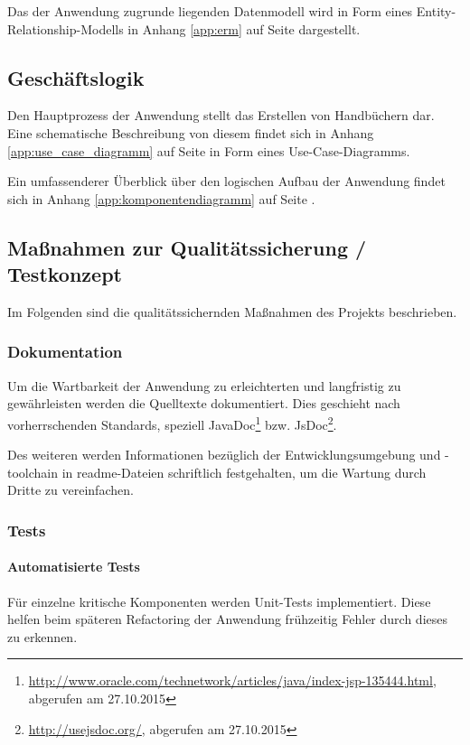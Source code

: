\documentclass[12pt, xcolor=dvipsnames]{scrartcl}
\begin{document}
Das der Anwendung zugrunde liegenden Datenmodell wird in Form eines Entity-Relationship-Modells in Anhang \ref{app:erm} auf Seite \pageref{app:erm} dargestellt.

\subsection{Geschäftslogik}

Den Hauptprozess der Anwendung stellt das Erstellen von Handbüchern dar. Eine schematische Beschreibung von diesem findet sich in Anhang \ref{app:use_case_diagramm} auf Seite \pageref{app:use_case_diagramm} in Form eines Use-Case-Diagramms.

Ein umfassenderer Überblick über den logischen Aufbau der Anwendung findet sich in Anhang \ref{app:komponentendiagramm} auf Seite \pageref{app:komponentendiagramm}.

\subsection{Maßnahmen zur Qualitätssicherung / Testkonzept}

Im Folgenden sind die qualitätssichernden Maßnahmen des Projekts beschrieben.

\subsubsection*{Dokumentation}
Um die Wartbarkeit der Anwendung zu erleichterten und langfristig zu gewährleisten werden die Quelltexte dokumentiert. Dies geschieht nach vorherrschenden Standards, speziell
JavaDoc\footnote{\url{http://www.oracle.com/technetwork/articles/java/index-jsp-135444.html}, abgerufen am 27.10.2015}
bzw.
JsDoc\footnote{\url{http://usejsdoc.org/}, abgerufen am 27.10.2015}.

Des weiteren werden Informationen bezüglich der Entwicklungsumgebung und -toolchain in readme-Dateien schriftlich festgehalten, um die Wartung durch Dritte zu vereinfachen.

\subsubsection*{Tests}
\label{sec:test:test}

\paragraph{Automatisierte Tests}
Für einzelne kritische Komponenten werden Unit-Tests implementiert. Diese helfen beim späteren Refactoring der Anwendung frühzeitig Fehler durch dieses zu erkennen.
\end{document}
